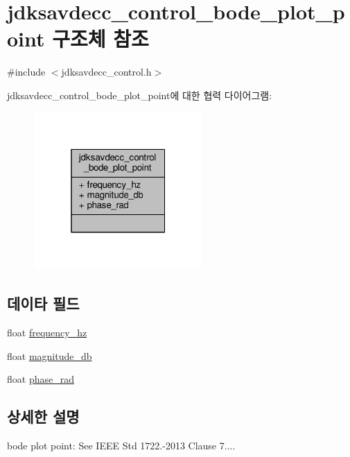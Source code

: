 \hypertarget{structjdksavdecc__control__bode__plot__point}{}\section{jdksavdecc\+\_\+control\+\_\+bode\+\_\+plot\+\_\+point 구조체 참조}
\label{structjdksavdecc__control__bode__plot__point}


{\ttfamily \#include $<$jdksavdecc\+\_\+control.\+h$>$}



jdksavdecc\+\_\+control\+\_\+bode\+\_\+plot\+\_\+point에 대한 협력 다이어그램\+:
\nopagebreak
\begin{figure}[H]
\begin{center}
\leavevmode
\includegraphics[width=181pt]{structjdksavdecc__control__bode__plot__point__coll__graph}
\end{center}
\end{figure}
\subsection*{데이타 필드}
\begin{DoxyCompactItemize}
\item 
float \hyperlink{structjdksavdecc__control__bode__plot__point_a86b78ddbbd5e07fa57a0257c75c0c7e5}{frequency\+\_\+hz}
\item 
float \hyperlink{structjdksavdecc__control__bode__plot__point_a7a53dd9821ee2fdf9fd6387c75368525}{magnitude\+\_\+db}
\item 
float \hyperlink{structjdksavdecc__control__bode__plot__point_a4080b971d468d463b942c2279f7465a3}{phase\+\_\+rad}
\end{DoxyCompactItemize}


\subsection{상세한 설명}
bode plot point\+: See I\+E\+EE Std 1722.-\/2013 Clause 7.... 

